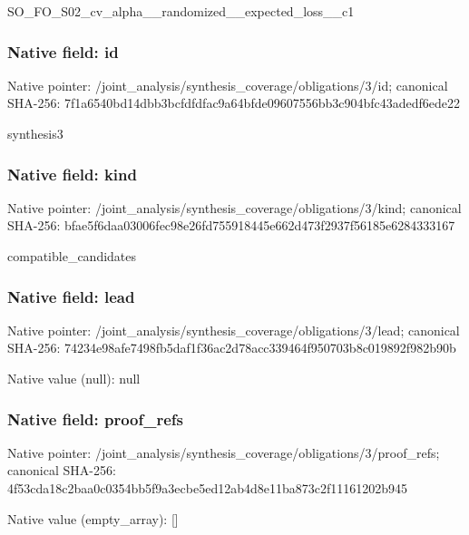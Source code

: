 \documentclass[10pt,a4paper]{article}
\begin{document}
SO\_FO\_S02\_cv\_alpha\_\_rand\allowbreak{}omized\_\_expected\_loss\_\_c\allowbreak{}1


\subsubsection{Native field: id}


Native pointer: /joint\_analysis/synthesi\allowbreak{}s\_coverage/obligations/3\allowbreak{}/id; canonical SHA-256: 7f1a6540bd14dbb3bcfdfdfa\allowbreak{}c9a64bfde09607556bb3c904\allowbreak{}bfc43adedf6ede22


synthesis3


\subsubsection{Native field: kind}


Native pointer: /joint\_analysis/synthesi\allowbreak{}s\_coverage/obligations/3\allowbreak{}/kind; canonical SHA-256: bfae5f6daa03006fec98e26f\allowbreak{}d755918445e662d473f2937f\allowbreak{}56185e6284333167


compatible\_candidates


\subsubsection{Native field: lead}


Native pointer: /joint\_analysis/synthesi\allowbreak{}s\_coverage/obligations/3\allowbreak{}/lead; canonical SHA-256: 74234e98afe7498fb5daf1f3\allowbreak{}6ac2d78acc339464f950703b\allowbreak{}8c019892f982b90b



Native value (null): null



\subsubsection{Native field: proof\_refs}


Native pointer: /joint\_analysis/synthesi\allowbreak{}s\_coverage/obligations/3\allowbreak{}/proof\_refs; canonical SHA-256: 4f53cda18c2baa0c0354bb5f\allowbreak{}9a3ecbe5ed12ab4d8e11ba87\allowbreak{}3c2f11161202b945



Native value (empty\_array): []
\end{document}
